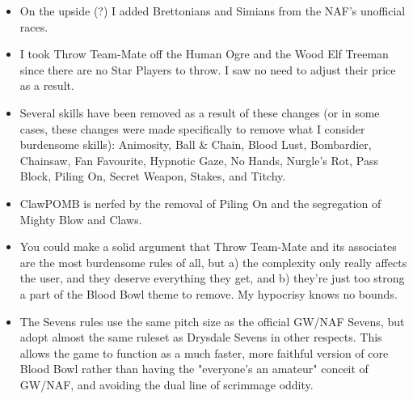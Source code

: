 \begin{multicols}{2}
\begin{itemize}
\item On the upside (?) I added Brettonians and Simians from the NAF's unofficial races.
\item I took Throw Team-Mate off the Human Ogre and the Wood Elf Treeman since there are no Star Players to throw. I saw no need to adjust their price as a result.
\item Several skills have been removed as a result of these changes (or in some cases, these changes were made specifically to remove what I consider burdensome skills): Animosity, Ball \& Chain, Blood Lust, Bombardier, Chainsaw, Fan Favourite, Hypnotic Gaze, No Hands, Nurgle's Rot, Pass Block, Piling On, Secret Weapon, Stakes, and Titchy.
\item ClawPOMB is nerfed by the removal of Piling On and the segregation of Mighty Blow and Claws.
\item You could make a solid argument that Throw Team-Mate and its associates are the most burdensome rules of all, but a) the complexity only really affects the user, and they deserve everything they get, and b) they're just too strong a part of the Blood Bowl theme to remove. My hypocrisy knows no bounds.
\item The Sevens rules use the same pitch size as the official GW/NAF Sevens, but adopt almost the same ruleset as Drysdale Sevens in other respects. This allows the game to function as a much faster, more faithful version of core Blood Bowl rather than having the "everyone's an amateur" conceit of GW/NAF, and avoiding the dual line of scrimmage oddity.
\end{itemize}

\end{multicols}
